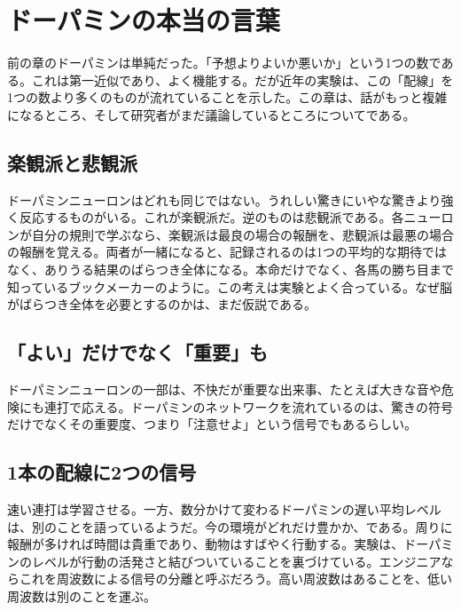 \chapter{ドーパミンの本当の言葉}

前の章のドーパミンは単純だった。「予想よりよいか悪いか」という1つの数である。これは第一近似であり、よく機能する。だが近年の実験は、この「配線」を1つの数より多くのものが流れていることを示した。この章は、話がもっと複雑になるところ、そして研究者がまだ議論しているところについてである。

\section*{楽観派と悲観派}

ドーパミンニューロンはどれも同じではない。うれしい驚きにいやな驚きより強く反応するものがいる。これが楽観派だ。逆のものは悲観派である。各ニューロンが自分の規則で学ぶなら、楽観派は最良の場合の報酬を、悲観派は最悪の場合の報酬を覚える。両者が一緒になると、記録されるのは1つの平均的な期待ではなく、ありうる結果のばらつき全体になる。本命だけでなく、各馬の勝ち目まで知っているブックメーカーのように。この考えは実験とよく合っている。なぜ脳がばらつき全体を必要とするのかは、まだ仮説である。


\section*{「よい」だけでなく「重要」も}

ドーパミンニューロンの一部は、不快だが重要な出来事、たとえば大きな音や危険にも連打で応える。ドーパミンのネットワークを流れているのは、驚きの符号だけでなくその重要度、つまり「注意せよ」という信号でもあるらしい。

\section*{1本の配線に2つの信号}

速い連打は学習させる。一方、数分かけて変わるドーパミンの遅い平均レベルは、別のことを語っているようだ。今の環境がどれだけ豊かか、である。周りに報酬が多ければ時間は貴重であり、動物はすばやく行動する。実験は、ドーパミンのレベルが行動の活発さと結びついていることを裏づけている。エンジニアならこれを周波数による信号の分離と呼ぶだろう。高い周波数はあることを、低い周波数は別のことを運ぶ。

